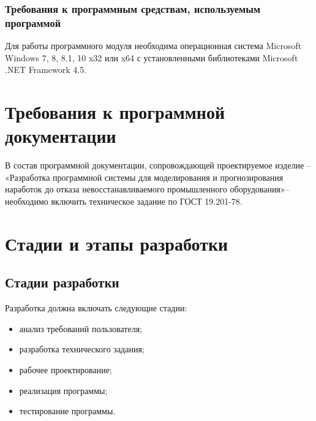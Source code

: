 \documentclass[14pt]{extarticle}        %
\begin{document}
\subsubsection {Требования к программным средствам, используемым программой}
Для работы программного модуля необходима операционная система Microsoft Windows 7, 8, 8.1, 10 x32 или x64 с установленными библиотеками Microsoft .NET Framework 4.5.
\newpage

\section {Требования к программной документации}
В состав программной документации, сопровождающей проектируемое изделие – «Разработка программной системы для моделирования и прогнозирования наработок до отказа невосстанавливаемого промышленного оборудования»– необходимо включить техническое задание по ГОСТ 19.201-78.

\newpage

\section {Стадии и этапы разработки}
\subsection {Стадии разработки}
Разработка должна включать следующие стадии: 
\begin{itemize}
    \item анализ требований пользователя; 
    \item разработка технического задания; 
    \item рабочее проектирование;
    \item реализация программы;
    \item тестирование программы.
\end{itemize}
\end{document}
